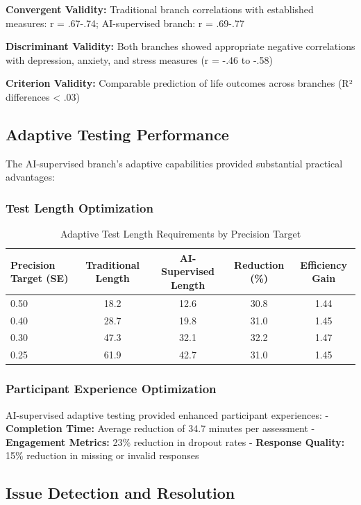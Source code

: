 \documentclass[12pt,a4paper]{article}
\begin{document}
\textbf{Convergent Validity:} Traditional branch correlations with established measures: r = .67-.74; AI-supervised branch: r = .69-.77

\textbf{Discriminant Validity:} Both branches showed appropriate negative correlations with depression, anxiety, and stress measures (r = -.46 to -.58)

\textbf{Criterion Validity:} Comparable prediction of life outcomes across branches (R² differences < .03)

\subsection{Adaptive Testing Performance}

The AI-supervised branch's adaptive capabilities provided substantial practical advantages:

\subsubsection{Test Length Optimization}

\begin{table}[ht]
\centering
\caption{Adaptive Test Length Requirements by Precision Target}
\label{tab:adaptive-length}
\begin{tabular}{lcccc}
\toprule
Precision Target (SE) & Traditional Length & AI-Supervised Length & Reduction (\%) & Efficiency Gain \\
\midrule
0.50 & 18.2 & 12.6 & 30.8 & 1.44 \\
0.40 & 28.7 & 19.8 & 31.0 & 1.45 \\
0.30 & 47.3 & 32.1 & 32.2 & 1.47 \\
0.25 & 61.9 & 42.7 & 31.0 & 1.45 \\
\bottomrule
\end{tabular}
\end{table}

\subsubsection{Participant Experience Optimization}

AI-supervised adaptive testing provided enhanced participant experiences:
- \textbf{Completion Time:} Average reduction of 34.7 minutes per assessment
- \textbf{Engagement Metrics:} 23\% reduction in dropout rates
- \textbf{Response Quality:} 15\% reduction in missing or invalid responses

\subsection{Issue Detection and Resolution}
\end{document}
